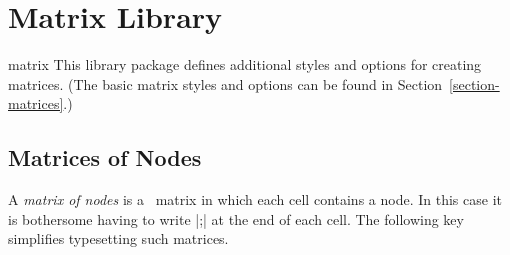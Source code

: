 %
%
%


\section{Matrix Library}

\begin{tikzlibrary}{matrix}
    This library package defines additional styles and options for creating
    matrices. (The basic matrix styles and options can be found in
    Section~\ref{section-matrices}.)
\end{tikzlibrary}


\subsection{Matrices of Nodes}

A \emph{matrix of nodes} is a \tikzname\ matrix in which each cell contains a
node. In this case it is bothersome having to write |;| at the end of each cell. The following key simplifies
typesetting such matrices.

